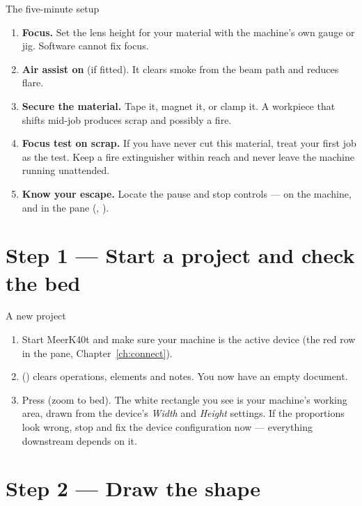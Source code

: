 \begin{machinebox}{The five-minute setup}
\begin{enumerate}[label=\arabic*.,leftmargin=1.4em]
  \item \textbf{Focus.} Set the lens height for your material with the machine's
        own gauge or jig. Software cannot fix focus.
  \item \textbf{Air assist on} (if fitted). It clears smoke from the beam path and
        reduces flare.
  \item \textbf{Secure the material.} Tape it, magnet it, or clamp it. A workpiece
        that shifts mid-job produces scrap and possibly a fire.
  \item \textbf{Focus test on scrap.} If you have never cut this material, treat
        your first job as the test. Keep a fire extinguisher within reach and
        never leave the machine running unattended.
  \item \textbf{Know your escape.} Locate the pause and stop controls --- on the
        machine, and in the  pane (,
        ).
\end{enumerate}
\end{machinebox}

\section{Step 1 --- Start a project and check the bed}

\begin{walkthrough}{A new project}
\begin{enumerate}[label=\arabic*.,leftmargin=1.4em]
  \item Start MeerK40t and make sure your machine is the active device (the red
        row in the  pane, Chapter~\ref{ch:connect}).
  \item {} () clears operations, elements and notes. You
        now have an empty document.
  \item Press  (zoom to bed). The white rectangle you see is your
        machine's working area, drawn from the device's \emph{Width} and
        \emph{Height} settings. If the proportions look wrong, stop and fix the
        device configuration now --- everything downstream depends on it.
\end{enumerate}
\end{walkthrough}

\section{Step 2 --- Draw the shape}

